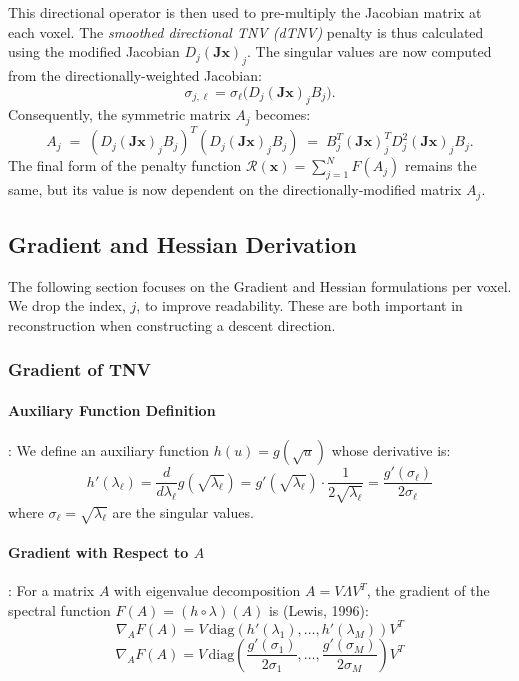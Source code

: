 This directional operator is then used to pre-multiply the Jacobian matrix at each voxel. The \emph{smoothed directional TNV (dTNV)} penalty is thus calculated using the modified Jacobian \( D_j (\mathbf{J}\mathbf{x})_j \). The singular values are now computed from the directionally-weighted Jacobian:
\[
  \sigma_{j,\ell} = \sigma_\ell\bigl( D_j (\mathbf{J}\mathbf{x})_j B_j \bigr).
\]
Consequently, the symmetric matrix \(A_j\) becomes:
\[
  A_j
  \;=\; \left( D_j (\mathbf{J}\mathbf{x})_j B_j \right)^T \left( D_j (\mathbf{J}\mathbf{x})_j B_j \right)
  \;=\; B_j^T (\mathbf{J}\mathbf{x})_j^T D_j^2 (\mathbf{J}\mathbf{x})_j B_j.
\]
The final form of the penalty function \(\mathcal{R}(\mathbf{x}) = \sum_{j=1}^N F(A_j)\) remains the same, but its value is now dependent on the directionally-modified matrix \(A_j\).


\hrulefill

\subsection{Gradient and Hessian Derivation}

The following section focuses on the Gradient and Hessian formulations per voxel. We drop the index, $j$, to improve readability. These are both important in reconstruction when constructing a descent direction.

\subsubsection{Gradient of TNV}

\paragraph{Auxiliary Function Definition}:
We define an auxiliary function $h(u) = g(\sqrt{u})$ whose derivative is:
\[
h'(\lambda_\ell) = \frac{d}{d\lambda_\ell} g(\sqrt{\lambda_\ell}) = g'(\sqrt{\lambda_\ell}) \cdot \frac{1}{2\sqrt{\lambda_\ell}} = \frac{g'(\sigma_\ell)}{2\sigma_\ell}
\]
where $\sigma_\ell = \sqrt{\lambda_\ell}$ are the singular values.

\paragraph{Gradient with Respect to $A$}:
For a matrix $A$ with eigenvalue decomposition $A = V\Lambda V^T$, the gradient of the spectral function $F(A) = (h \circ \lambda)(A)$ is (Lewis, 1996):
\[
\nabla_{A} F(A) = V \,\text{diag}\left(h'(\lambda_1), \ldots, h'(\lambda_M)\right) V^T
\]
\[
\nabla_{A} F(A) = V \,\text{diag}\left(\frac{g'(\sigma_1)}{2\sigma_1}, \ldots, \frac{g'(\sigma_M)}{2\sigma_M}\right) V^T
\]


